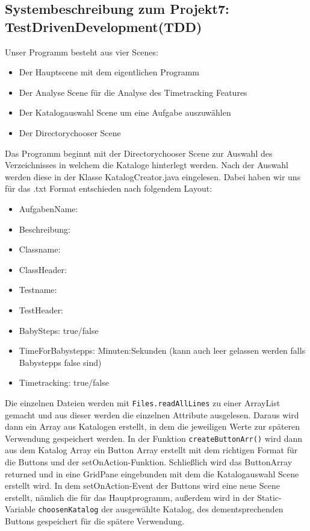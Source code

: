 \documentclass[10pt]{article}
\begin{document}
\begin{center}

\section*{Systembeschreibung zum Projekt7: TestDrivenDevelopment(TDD)}

\end{center}
\bigskip
Unser Programm besteht aus vier Scenes:
\medskip
\begin{itemize}

\item Der Hauptscene mit dem eigentlichen Programm
\item Der Analyse Scene für die Analyse des Timetracking Features
\item Der Katalogauswahl Scene um eine Aufgabe auszuwählen
\item Der Directorychooser Scene

\end{itemize}
\medskip
Das Programm beginnt mit der Directorychooser Scene zur Auswahl des Verzeichnisses in welchem die Kataloge hinterlegt werden. Nach der Auswahl werden diese in der Klasse KatalogCreator.java eingelesen. Dabei haben wir uns für das .txt Format entschieden nach folgendem Layout:
\begin{itemize}

\item[] AufgabenName:

\item[] Beschreibung:

\item[] Classname:

\item[] ClassHeader:

\item[] Testname:

\item[] TestHeader:

\item[]BabySteps: true/false
\item[] TimeForBabystepps: Minuten:Sekunden (kann auch leer gelassen werden falls Babystepps false sind)
\item[] Timetracking: true/false
\end{itemize}
\medskip
Die einzelnen Dateien werden mit \verb+Files.readAllLines+ zu einer ArrayList gemacht und aus dieser werden die einzelnen Attribute ausgelesen. Daraus wird dann ein Array aus Katalogen erstellt, in dem die jeweiligen Werte zur späteren Verwendung gespeichert werden. In der Funktion \verb+createButtonArr()+ wird dann aus dem Katalog Array ein Button Array erstellt mit dem richtigen Format für die Buttons und der setOnAction-Funktion. Schließlich wird das ButtonArray returned und in eine GridPane eingebunden mit dem die Katalogauswahl Scene erstellt wird. In dem setOnAction-Event der Buttons wird eine neue Scene erstellt, nämlich die für das Hauptprogramm, außerdem wird in der Static-Variable \verb+choosenKatalog+ der ausgewählte Katalog, des dementsprechenden Buttons gespeichert für die spätere Verwendung.
\end{document}
